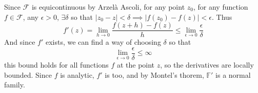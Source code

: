 \documentclass{homework}
\begin{document}
\begin{solution}
                                                                                                                                                            Since $\mathcal{F}$ is equicontinuous by Arzel\`a Ascoli, for any point $z_0$, for any function $f\in\mathcal{F}$, any $\epsilon > 0$, $\exists \delta$ so that $|z_0 - z|<\delta\implies |f(z_0) - f(z)| < \epsilon$. Thus 
                                                                                                                                                            \[
                                                                                                                                                            f'(z) = \lim_{h\to 0}\frac{f(z+h) - f(z)}{h} \leq \lim_{\epsilon\to 0}\frac{\epsilon}{\delta}
                                                                                                                                                            \]
                                                                                                                                                            And since $f'$ exists, we can find a way of choosing $\delta$ so that 
                                                                                                                                                            \[
                                                                                                                                                            \lim_{\epsilon\to 0}\frac{\epsilon}{\delta}\leq \infty
                                                                                                                                                            \]
                                                                                                                                                            this bound holds for all functions $f$ at the point $z$, so the derivatives are locally bounded. Since $f$ is analytic, $f'$ is too, and by Montel's thorem, $\mathbb{F'}$ is a normal family.
                                                                                                                                                            \end{solution}
                                                                                                                                                            
\end{document}
